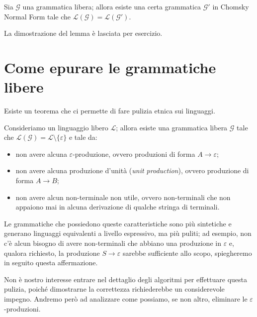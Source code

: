\documentclass[class=book, crop=false, oneside, 12pt]{standalone}
\begin{document}
\begin{lemma}
  Sia \(\mathcal{G}\) una grammatica libera; allora esiste una certa grammatica \(\mathcal{G'}\) in Chomsky Normal Form tale che \(\mathcal{L(G)} = \mathcal{L(G')}\).
\end{lemma}

\noindent La dimostrazione del lemma è lasciata per esercizio.

\section{Come epurare le grammatiche libere}
Esiste un teorema che ci permette di fare pulizia etnica sui linguaggi.
\begin{theorem}
  Consideriamo un linguaggio libero \(\mathcal{L}\); allora esiste una grammatica libera \(\mathcal{G}\) tale che \(\mathcal{L(G)} = \mathcal{L} \setminus \{ \varepsilon \}\) e tale da:
  \begin{itemize}
    \item non avere alcuna \(\varepsilon\)-produzione, ovvero produzioni di forma \(A \rightarrow \varepsilon\);
    \item non avere alcuna produzione d'unità (\emph{unit production}), ovvero produzione di forma \(A \rightarrow B\);
    \item non avere alcun non-terminale non utile, ovvero non-terminali che non appaiono mai in alcuna derivazione di qualche stringa di terminali.
  \end{itemize}
\end{theorem}

Le grammatiche che possiedono queste caratteristiche sono più sintetiche e generano linguaggi equivalenti a livello espressivo, ma più puliti; ad esempio, non c'è alcun bisogno di avere non-terminali che abbiano una produzione in \(\varepsilon\) e, qualora richiesto, la produzione \(S \rightarrow \varepsilon\) sarebbe sufficiente allo scopo, spiegheremo in seguito questa affermazione.

Non è nostro interesse entrare nel dettaglio degli algoritmi per effettuare questa pulizia, poiché dimostrarne la correttezza richiederebbe un considerevole impegno. Andremo però ad analizzare come possiamo, se non altro,  eliminare le \(\varepsilon\)-produzioni.
\end{document}
